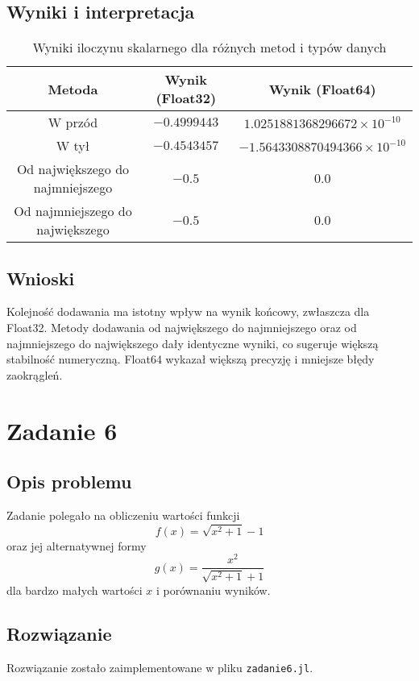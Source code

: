 \documentclass{article}
\begin{document}
\subsection{Wyniki i interpretacja}
\begin{table}[h!]
\centering
\renewcommand{\arraystretch}{1.3}
\begin{tabular}{|c|c|c|}
\hline
Metoda & Wynik (Float32) & Wynik (Float64) \\
\hline
W przód & $-0.4999443$ & $1.0251881368296672 \times 10^{-10}$ \\
W tył & $-0.4543457$ & $-1.5643308870494366 \times 10^{-10}$ \\
Od największego do najmniejszego & $-0.5$ & $0.0$ \\
Od najmniejszego do największego & $-0.5$ & $0.0$ \\
\hline
\end{tabular}
\caption{Wyniki iloczynu skalarnego dla różnych metod i typów danych}
\end{table}

\subsection{Wnioski}
Kolejność dodawania ma istotny wpływ na wynik końcowy, zwłaszcza dla Float32. Metody dodawania od największego do najmniejszego oraz od najmniejszego do największego dały identyczne wyniki, co sugeruje większą stabilność numeryczną. Float64 wykazał większą precyzję i mniejsze błędy zaokrągleń.

\section{Zadanie 6}
\subsection{Opis problemu}
Zadanie polegało na obliczeniu wartości funkcji
\[
f(x) = \sqrt{x^2 + 1} - 1
\]
oraz jej alternatywnej formy
\[
g(x) = \frac{x^2}{\sqrt{x^2 + 1} + 1}
\]
dla bardzo małych wartości $x$ i porównaniu wyników.

\subsection{Rozwiązanie}
Rozwiązanie zostało zaimplementowane w pliku \texttt{zadanie6.jl}.
\end{document}
